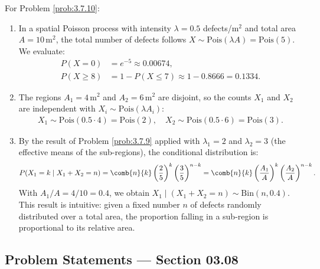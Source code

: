 \begin{solucion}
	\label{sol:3.7.10}
	For Problem \ref{prob:3.7.10}:
	\begin{enumerate}
		\item In a spatial Poisson process with intensity $\lambda = 0.5$ defects/$\text{m}^{2}$ and total area $A = 10\,\text{m}^{2}$, the total number of defects follows $X \sim \text{Pois}(\lambda A) = \text{Pois}(5)$. We evaluate:
		\begin{align*}
			P(X = 0) &= e^{-5} \approx 0.00674, \\
			P(X \ge 8) &= 1 - P(X \le 7) \approx 1 - 0.8666 = 0.1334.
		\end{align*}
		\item The regions $A_{1} = 4\,\text{m}^{2}$ and $A_{2} = 6\,\text{m}^{2}$ are disjoint, so the counts $X_{1}$ and $X_{2}$ are independent with $X_{i} \sim \text{Pois}(\lambda A_{i})$:
		\begin{align*}
			X_{1} \sim \text{Pois}(0.5 \cdot 4) = \text{Pois}(2), \quad X_{2} \sim \text{Pois}(0.5 \cdot 6) = \text{Pois}(3).
		\end{align*}
		\item By the result of Problem \ref{prob:3.7.9} applied with $\lambda_{1} = 2$ and $\lambda_{2} = 3$ (the effective means of the sub-regions), the conditional distribution is:
		\begin{align*}
			P(X_{1} = k \mid X_{1} + X_{2} = n) = \comb{n}{k} \left(\dfrac{2}{5}\right)^{k} \left(\dfrac{3}{5}\right)^{n-k} = \comb{n}{k} \left(\dfrac{A_{1}}{A}\right)^{k} \left(\dfrac{A_{2}}{A}\right)^{n-k}.
		\end{align*}
		With $A_{1}/A = 4/10 = 0.4$, we obtain $X_{1} \mid (X_{1} + X_{2} = n) \sim \text{Bin}(n, 0.4)$. This result is intuitive: given a fixed number $n$ of defects randomly distributed over a total area, the proportion falling in a sub-region is proportional to its relative area. \qedhere
	\end{enumerate}
\end{solucion}


\subsection*{Problem Statements --- Section 03.08}


